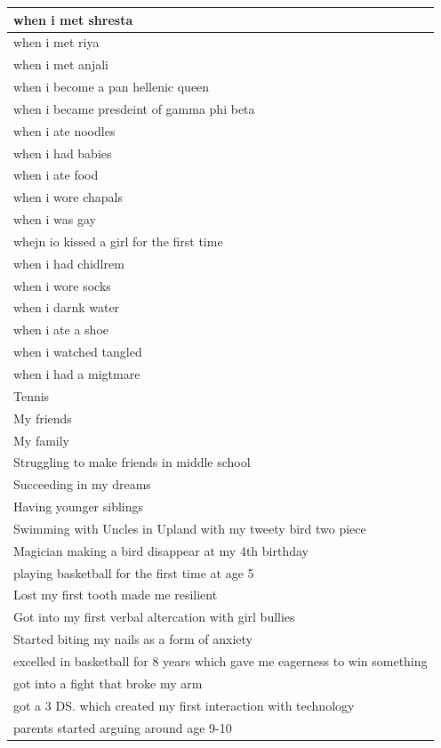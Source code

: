 \documentclass[
  .7em,
  letterpaper,
  DIV=11,
  numbers=noendperiod]{scrartcl}
\begin{document}
\begin{table}
\begin{tabular}{l}
\hline
when i met shresta\\
\hline
when i met riya\\
\hline
when i met anjali\\
\hline
when i become a pan hellenic queen\\
\hline
when i became presdeint of gamma phi beta\\
\hline
when i ate noodles\\
\hline
when i had babies\\
\hline
when i ate food\\
\hline
when i wore chapals\\
\hline
when i was gay\\
\hline
whejn io kissed a girl for the first time\\
\hline
when i had chidlrem\\
\hline
when i wore socks\\
\hline
when i darnk water\\
\hline
when i ate a shoe\\
\hline
when i watched tangled\\
\hline
when i had a migtmare\\
\hline
Tennis\\
\hline
My friends\\
\hline
My family\\
\hline
Struggling to make friends in middle school\\
\hline
Succeeding in my dreams\\
\hline
Having younger siblings\\
\hline
Swimming with Uncles in Upland with my tweety bird two piece\\
\hline
Magician making a bird disappear at my 4th birthday\\
\hline
playing basketball for the first time at age 5\\
\hline
Lost my first tooth made me resilient\\
\hline
Got into my first verbal altercation with girl bullies\\
\hline
Started biting my nails as a form of anxiety\\
\hline
excelled in basketball for 8 years which gave me eagerness to win something\\
\hline
got into a fight  that broke my arm\\
\hline
got a 3 DS. which created my first interaction with technology\\
\hline
parents started arguing around age 9-10\\

\end{tabular}
\end{table}
\end{document}
